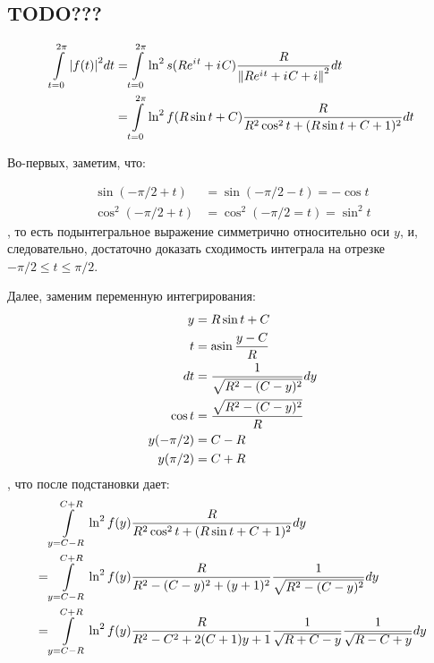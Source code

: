 
\subsection*{TODO???}

\begin{align*}
       \int\limits_{t=0}^{2 \pi} \abs{f(t)}^2 dt
   = & \int\limits_{t = 0}^{2 \pi} \ln^2 s(R e^{{i\mkern1mu} t} + {i\mkern1mu} C) \frac{R}{\norm{R e^{{i\mkern1mu} t} + {i\mkern1mu} C + i}^2} dt
\\ = & \int\limits_{t = 0}^{2 \pi} \ln^2 f(R \sin t + C) \frac{R}{R^2 \cos^2 t + (R \sin t + C + 1)^2} dt
\end{align*}

Во-первых, заметим, что:

\begin{equation*}
\begin{aligned}
   \sin(-\pi/2 + t)   &= \sin(-\pi/2 - t) = - \cos t
\\ \cos^2(-\pi/2 + t) &= \cos^2(-\pi/2 = t) = \sin^2 t
\end{aligned}
\end{equation*}
, то есть подынтегральное выражение симметрично относительно оси $y$, и, следовательно, достаточно доказать сходимость интеграла на отрезке $-\pi/2 \le t \le \pi/2$.

Далее, заменим переменную интегрирования:
\begin{equation*}
\begin{aligned}
   y         &= R \sin t + C
\\ t         &= \asin \frac{y - C}{R}
\\ dt        &= \frac{1}{\sqrt{R^2 - (C - y)^2}} dy
\\ \cos t    &= \frac{\sqrt{R^2 - (C - y)^2}}{R}
\\ y(-\pi/2) &= C - R 
\\ y(\pi/2)  &= C + R 
\end{aligned}
\end{equation*}
, что после подстановки дает:
\begin{equation}\label{eq:int_f}
\resizebox{0.9\hsize}{!}{$
\begin{aligned}
    & \int\limits_{y = C - R}^{C + R} \ln^2 f(y) \frac{R}{R^2 \cos^2 t + (R \sin t + C + 1)^2} dy \\
=   & \int\limits_{y = C - R}^{C + R} \ln^2 f(y) \frac{R}{R^2 - (C - y)^2 + (y + 1)^2} \frac{1}{\sqrt{R^2 - (C - y)^2}} dy\\
=   & \int\limits_{y = C - R}^{C + R} \ln^2 f(y) \frac{R}{R^2 - C^2 + 2 (C + 1) y + 1} \frac{1}{\sqrt{R + C - y}} \frac{1}{\sqrt{R - C + y}}  dy\\
\end{aligned}
$}
\end{equation}

